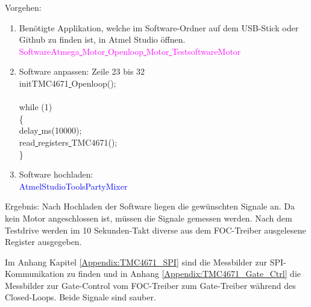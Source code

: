 Vorgehen:
\begin{enumerate}
\item Benötigte Applikation, welche im Software-Ordner auf dem USB-Stick oder Github \cite{aebi_projekt-6softwareatmega_2020} zu finden ist, in Atmel Studio öffnen.\\
\textcolor{magenta}{Software\textrightarrow Atmega\underline{ }Motor\underline{ }Openloop\underline{ }Motor\underline{ }Testsoftware\textrightarrow Motor}\\

\item Software anpassen: Zeile 23 bis 32\\
\textcolor{OliveGreen}{
	initTMC4671\underline{ }Openloop();\\
\\
    while (1) \\
    \{\\
		\underline{ }delay\underline{ }ms(10000);\\
		read\underline{ }registers\underline{ }TMC4671();\\
    \}
}\\

\item Software hochladen:\\
\textcolor{blue}{AtmelStudio\textrightarrow Tools\textrightarrow PartyMixer}\\
\end{enumerate}

Ergebnis: Nach Hochladen der Software liegen die gewünschten Signale an. Da kein Motor angeschlossen ist, müssen die Signale gemessen werden. Nach dem Testdrive werden im 10 Sekunden-Takt diverse aus dem FOC-Treiber ausgelesene Register ausgegeben.

Im Anhang Kapitel \ref{Appendix:TMC4671_SPI} sind die Messbilder zur SPI- Kommunikation zu finden und in Anhang \ref{Appendix:TMC4671_Gate_Ctrl} die Messbilder zur Gate-Control vom FOC-Treiber zum Gate-Treiber während des Closed-Loops. Beide Signale sind sauber.